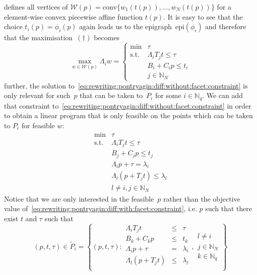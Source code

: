 \documentclass[a4paper, 12pt, twoside]{article}
\theoremstyle{definition}
\numberwithin{equation}{section}
\providecommand{\conv}{\text{conv}}
\providecommand{\epi}{\text{epi}}
\begin{document}
%
defines all vertices of $\mathcal W(p) = \conv\{w_1(t(p)),\dots,w_N(t(p))\}$ for a element-wise convex piecewise affine function $t(p)$.
%
It is easy to see that the choice $t_i(p)=\phi_i(p)$ again leads us to the epigraph~$\epi(\phi_i)$ and therefore that the maximisation~$(\dagger)$ becomes
%
\begin{equation}\label{eq:rewriting:pontryagin:diff:without:facet:constraint}
  \max_{w\in\mathcal W(p)}\Lambda_i w = \left\{\begin{array}{rl}
  \min& \tau\\
  \text{s.t.}& \Lambda_iT_jt\leq\tau\\
  & B_i+C_ip\leq t_i\\
  & j\in\mathbb N_N
  \end{array}\right.
\end{equation}
%
further, the solution to~\eqref{eq:rewriting:pontryagin:diff:without:facet:constraint} is only relevant for such~$p$ that can be taken to~$P_i$ for some $i\in\mathbb N_q$.
%
We can add that constraint to~\eqref{eq:rewriting:pontryagin:diff:without:facet:constraint} in order to obtain a linear program that is only feasible on the points which can be taken to $P_i$ for feasible $w$:
%
\begin{equation}\label{eq:rewriting:pontryagin:diff:with:facet:constraint}
  \begin{array}{rl}
  \min& \tau\\
  \text{s.t.}& \Lambda_iT_jt\leq\tau\\
  & B_j+C_j p\leq t_j\\
  &\Lambda_i p + \tau=\lambda_i\\
  &\Lambda_l(p + T_jt)\leq\lambda_l\\
  &l\neq i, j\in\mathbb N_N
  \end{array}
\end{equation}
%
Notice that we are only interested in the feasible~$p$ rather than the objective value of~\eqref{eq:rewriting:pontryagin:diff:with:facet:constraint}, i.e. $p$ such that there exist $t$ and $\tau$ such that 
%
\begin{equation}
  (p,t,\tau)\in\tilde P_i=\left\{(p,t,\tau):\begin{array}{rcl}
  \Lambda_iT_jt&\leq&\tau\\
  B_k+C_k p&\leq& t_k\\
  \Lambda_i p + \tau&=&\lambda_i\\
  \Lambda_l(p + T_jt)&\leq&\lambda_l\\
  \end{array},\begin{array}{l}
   l\neq i\\
   j\in\mathbb N_N\\
   k\in\mathbb N_q
   \end{array}
   \right\}
\end{equation}
\end{document}
